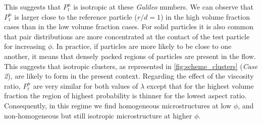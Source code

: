 This suggests that $P_\text{r}^n$ is isotropic at these \textit{Galileo} numbers. We can observe that $P_\text{r}^n$ is larger close to the reference particle ($r/d = 1$) in the high volume fraction cases than in the low volume fraction cases.
For solid particles it is also common that pair distributions are more concentrated at the contact of the test particle for increasing $\phi$. 
In practice, if particles are more likely to be close to one another, it means that densely packed regions of particles are present in the flow.
This suggests that isotropic clusters, as represented in \ref{fig:scheme_clusters} (\textit{Case 2}), are likely to form in the present context.%
Regarding the effect of the viscosity ratio, $P_\text{r}^n$ are very similar for both values of $\lambda$ except that for the highest volume fraction the region of highest probability is thinner for the lowest aspect ratio. 
Consequently, in this regime we find homogeneous microstructures at low $\phi$, and non-homogeneous but still isotropic microstructure at higher $\phi$. 

